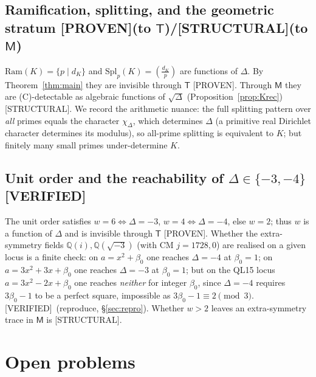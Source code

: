 \documentclass[11pt]{article}
\theoremstyle{definition}
\newcommand{\Q}{\mathbb{Q}}
\newcommand{\Kr}[2]{\left(\tfrac{#1}{#2}\right)}
\newcommand{\Tch}{\mathsf{T}}
\newcommand{\Mch}{\mathsf{M}}
\newcommand{\PROVEN}{\textsf{[PROVEN]}}
\newcommand{\VERIFIED}{\textsf{[VERIFIED]}}
\newcommand{\STRUCTURAL}{\textsf{[STRUCTURAL]}}
\begin{document}
\subsection{Ramification, splitting, and the geometric stratum \PROVEN(to $\Tch$)/\STRUCTURAL(to $\Mch$)}
$\mathrm{Ram}(K)=\{p\mid d_K\}$ and $\mathrm{Spl}_p(K)=\Kr{d_K}{p}$ are functions of
$\Delta$. By Theorem~\ref{thm:main} they are invisible through $\Tch$ \PROVEN. Through
$\Mch$ they are (C)-detectable as algebraic functions of $\sqrt\Delta$
(Proposition~\ref{prop:Krec}) \STRUCTURAL. We record the arithmetic nuance: the full
splitting pattern over \emph{all} primes equals the character $\chi_\Delta$, which
determines $\Delta$ (a primitive real Dirichlet character determines its modulus), so
all-prime splitting is equivalent to $K$; but finitely many small primes
under-determine $K$.

\subsection{Unit order and the reachability of $\Delta\in\{-3,-4\}$ \VERIFIED}
The unit order satisfies $w=6\iff\Delta=-3$, $w=4\iff\Delta=-4$, else $w=2$; thus $w$
is a function of $\Delta$ and is invisible through $\Tch$ \PROVEN. Whether the
extra-symmetry fields $\Q(i),\Q(\sqrt{-3})$ (with CM $j=1728,0$) are realised on a
given locus is a finite check: on $a=x^2+\beta_0$ one reaches $\Delta=-4$ at
$\beta_0=1$; on $a=3x^2+3x+\beta_0$ one reaches $\Delta=-3$ at $\beta_0=1$; but on the
QL15 locus $a=3x^2-2x+\beta_0$ one reaches \emph{neither} for integer $\beta_0$, since
$\Delta=-4$ requires $3\beta_0-1$ to be a perfect square, impossible as $3\beta_0-1
\equiv2\pmod 3$. \VERIFIED\ (reproduce, \S\ref{sec:repro}). Whether $w>2$ leaves an
extra-symmetry trace in $\Mch$ is \STRUCTURAL.

\section{Open problems}\label{sec:open}
\end{document}
